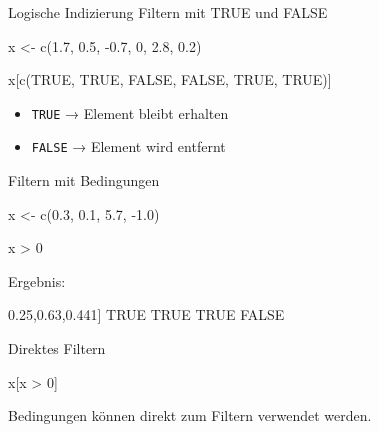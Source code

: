 \documentclass[
  10pt,
  ignorenonframetext,
  aspectratio=169,
]{beamer}
\newenvironment{Shaded}{}{}
\newcommand{\ConstantTok}[1]{\textcolor[rgb]{0.53,0.00,0.00}{#1}}
\newcommand{\DecValTok}[1]{\textcolor[rgb]{0.25,0.63,0.44}{#1}}
\newcommand{\FloatTok}[1]{\textcolor[rgb]{0.25,0.63,0.44}{#1}}
\newcommand{\FunctionTok}[1]{\textcolor[rgb]{0.02,0.16,0.49}{#1}}
\newcommand{\NormalTok}[1]{#1}
\newcommand{\OtherTok}[1]{\textcolor[rgb]{0.00,0.44,0.13}{#1}}
\newcommand{\SpecialCharTok}[1]{\textcolor[rgb]{0.25,0.44,0.63}{#1}}
\providecommand{\tightlist}{%
  \setlength{\itemsep}{0pt}\setlength{\parskip}{0pt}}
\begin{document}
\begin{frame}[fragile]{Logische Indizierung}
\label{logische-indizierung}
Filtern mit TRUE und FALSE

\begin{Shaded}
\begin{Highlighting}[]
\NormalTok{x }\OtherTok{\textless{}{-}} \FunctionTok{c}\NormalTok{(}\FloatTok{1.7}\NormalTok{, }\FloatTok{0.5}\NormalTok{, }\SpecialCharTok{{-}}\FloatTok{0.7}\NormalTok{, }\DecValTok{0}\NormalTok{, }\FloatTok{2.8}\NormalTok{, }\FloatTok{0.2}\NormalTok{)}

\NormalTok{x[}\FunctionTok{c}\NormalTok{(}\ConstantTok{TRUE}\NormalTok{, }\ConstantTok{TRUE}\NormalTok{, }\ConstantTok{FALSE}\NormalTok{, }\ConstantTok{FALSE}\NormalTok{, }\ConstantTok{TRUE}\NormalTok{, }\ConstantTok{TRUE}\NormalTok{)]}
\end{Highlighting}
\end{Shaded}

\begin{itemize}
\tightlist
\item
  \texttt{TRUE} → Element bleibt erhalten
\item
  \texttt{FALSE} → Element wird entfernt
\end{itemize}
\end{frame}

\begin{frame}[fragile]{Filtern mit Bedingungen}
\label{filtern-mit-bedingungen}
\begin{Shaded}
\begin{Highlighting}[]
\NormalTok{x }\OtherTok{\textless{}{-}} \FunctionTok{c}\NormalTok{(}\FloatTok{0.3}\NormalTok{, }\FloatTok{0.1}\NormalTok{, }\FloatTok{5.7}\NormalTok{, }\SpecialCharTok{{-}}\FloatTok{1.0}\NormalTok{)}

\NormalTok{x }\SpecialCharTok{\textgreater{}} \DecValTok{0}
\end{Highlighting}
\end{Shaded}

Ergebnis:

\begin{Shaded}
\begin{Highlighting}[]
\NormalTok{[}\DecValTok{1}\NormalTok{] }\ConstantTok{TRUE} \ConstantTok{TRUE} \ConstantTok{TRUE} \ConstantTok{FALSE}
\end{Highlighting}
\end{Shaded}
\end{frame}

\begin{frame}[fragile]{Direktes Filtern}
\label{direktes-filtern}
\begin{Shaded}
\begin{Highlighting}[]
\NormalTok{x[x }\SpecialCharTok{\textgreater{}} \DecValTok{0}\NormalTok{]}
\end{Highlighting}
\end{Shaded}

Bedingungen können direkt zum Filtern verwendet werden.
\end{frame}
\end{document}
